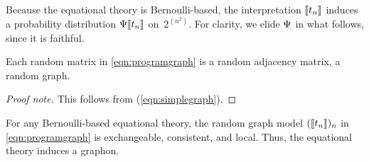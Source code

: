Because the equational theory is Bernoulli-based, the
interpretation $\llbracket t_n\rrbracket$ induces a probability distribution $\Psi\llbracket t_n\rrbracket$
on~$2^{(n^2)}$. For clarity, we elide $\Psi$ in what follows, since
it is faithful. 
\begin{proposition}
  Each random matrix in \eqref{eqn:programgraph} is a random adjacency matrix, \ie a random graph. 
\end{proposition}
\begin{proof}[Proof note]This follows from (\ref{eqn:simplegraph}).\end{proof}
\begin{theorem}\label{thm:eq-theory-to-graphon}
  For any Bernoulli-based equational theory, the random graph model $(\llbracket t_n\rrbracket)_n$ in \eqref{eqn:programgraph}
  is exchangeable, consistent, and local. Thus, the equational theory
  induces a graphon. 
\end{theorem}

